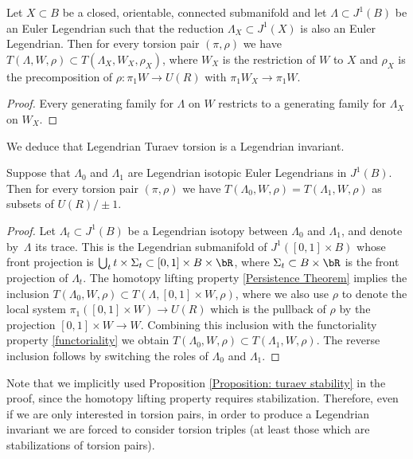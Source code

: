 \begin{proposition}\label{functoriality}
Let $X \subset B$ be a closed, orientable, connected submanifold and let $\Lambda \subset J^1(B)$ be an Euler Legendrian such that the reduction $\Lambda_X \subset J^1(X)$ is also an Euler Legendrian. Then for every torsion pair $(\pi, \rho)$ we have $T(\Lambda, W, \rho) \subset T(\Lambda_X, W_X, \rho_X)$, where $W_X$ is the restriction of $W$ to $X$ and $\rho_X$ is the precomposition of $\rho: \pi_1W \to U(R)$ with $\pi_1W_X \to \pi_1W$.
\end{proposition}

\begin{proof}
Every generating family for $\Lambda$ on $W$ restricts to a generating family for $\Lambda_X$ on $W_X$.
\end{proof}

We deduce that Legendrian Turaev torsion is a Legendrian invariant.

\begin{theorem}\label{legendrianinvariant}
Suppose that $\Lambda_0$ and $\Lambda_1$ are Legendrian isotopic Euler Legendrians in $J^1(B)$. Then for every torsion pair $(\pi, \rho)$ we have $T(\Lambda_0, W, \rho) = T(\Lambda_1, W, \rho)$ as subsets of $U(R) / \pm 1$.
\end{theorem}

\begin{proof}
Let $\Lambda_t\subset J^1(B)$ be a Legendrian isotopy between $\Lambda_0$ and $\Lambda_1$, and denote by~$\Lambda$ its trace. This is the Legendrian submanifold of $J^1([0,1] \times B)$ whose front projection is $\bigcup_t t \times \Sigma_t \subset [0,1] \times B \times \bR$, where $\Sigma_t \subset B \times \bR$ is the front projection of $\Lambda_t$. The homotopy lifting property \ref{Persistence Theorem} implies the inclusion \hbox{$T(\Lambda_0, W, \rho)\!\subset\!T(\Lambda, [0,1] \times W, \rho)$}, where we also use $\rho$ to denote the local system $\pi_1 ([0,1] \times W ) \to U(R)$ which is the pullback of $\rho$ by the projection $[0,1] \times W \to W$. Combining this inclusion with the functoriality property \ref{functoriality} we obtain $T(\Lambda_0, W, \rho) \subset T(\Lambda_1, W, \rho)$. The reverse inclusion follows by switching the roles of $\Lambda_0$ and $\Lambda_1$.
\end{proof}

\begin{remark}\label{remark: need triples}
Note that we implicitly used Proposition \ref{Proposition: turaev stability} in the proof, since the homotopy lifting property requires stabilization. Therefore, even if we are only interested in torsion pairs, in order to produce a Legendrian invariant we are forced to consider torsion triples (at least those which are stabilizations of torsion pairs).
\end{remark}

